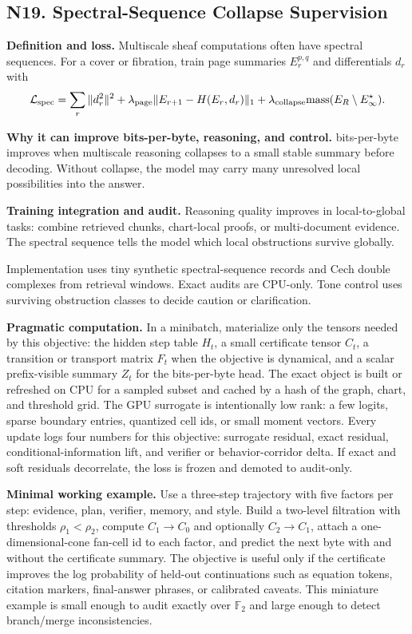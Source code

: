 \documentclass[10pt]{article}
\newcommand{\FF}{\mathbb{F}}
\newcommand{\loss}{\mathcal{L}}
\numberwithin{equation}{section}
\begin{document}
\subsection{N19. Spectral-Sequence Collapse Supervision}
\noindent\textbf{Definition and loss.} Multiscale sheaf computations often have spectral sequences. For a cover or fibration, train page summaries $E_r^{p,q}$ and differentials $d_r$ with
\[
\loss_{\rm spec}=\sum_r\|d_r^2\|^2+\lambda_{\rm page}\|E_{r+1}-H(E_r,d_r)\|_1+\lambda_{\rm collapse}\mathrm{mass}(E_R\setminus E_\infty^\star).
\]

\noindent\textbf{Why it can improve bits-per-byte, reasoning, and control.} bits-per-byte improves when multiscale reasoning collapses to a small stable summary before decoding. Without collapse, the model may carry many unresolved local possibilities into the answer.

\noindent\textbf{Training integration and audit.} Reasoning quality improves in local-to-global tasks: combine retrieved chunks, chart-local proofs, or multi-document evidence. The spectral sequence tells the model which local obstructions survive globally.

Implementation uses tiny synthetic spectral-sequence records and Cech double complexes from retrieval windows. Exact audits are CPU-only. Tone control uses surviving obstruction classes to decide caution or clarification.

\noindent\textbf{Pragmatic computation.} In a minibatch, materialize only the tensors needed by this objective: the hidden step table $H_t$, a small certificate tensor $C_t$, a transition or transport matrix $F_t$ when the objective is dynamical, and a scalar prefix-visible summary $Z_t$ for the bits-per-byte head. The exact object is built or refreshed on CPU for a sampled subset and cached by a hash of the graph, chart, and threshold grid. The GPU surrogate is intentionally low rank: a few logits, sparse boundary entries, quantized cell ids, or small moment vectors. Every update logs four numbers for this objective: surrogate residual, exact residual, conditional-information lift, and verifier or behavior-corridor delta. If exact and soft residuals decorrelate, the loss is frozen and demoted to audit-only.

\noindent\textbf{Minimal working example.} Use a three-step trajectory with five factors per step: evidence, plan, verifier, memory, and style. Build a two-level filtration with thresholds $\rho_1<\rho_2$, compute $C_1\to C_0$ and optionally $C_2\to C_1$, attach a one-dimensional-cone fan-cell id to each factor, and predict the next byte with and without the certificate summary. The objective is useful only if the certificate improves the log probability of held-out continuations such as equation tokens, citation markers, final-answer phrases, or calibrated caveats. This miniature example is small enough to audit exactly over $\FF_2$ and large enough to detect branch/merge inconsistencies.
\end{document}
